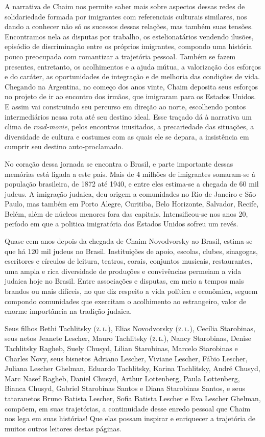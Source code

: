 A narrativa de Chaim nos permite saber mais sobre aspectos dessas redes
de solidariedade formada por imigrantes com referenciais culturais
similares, nos dando a conhecer não só os sucessos dessas relações, mas
também suas tensões. Encontramos nela as disputas por trabalho, os
estelionatários vendendo ilusões, episódio de discriminação entre os
próprios imigrantes, compondo uma história pouco preocupada com
romantizar a trajetória pessoal. Também se fazem presentes, entretanto,
os acolhimentos e a ajuda mútua, a valorização dos esforços e do
caráter, as oportunidades de integração e de melhoria das condições de
vida. Chegando na Argentina, no começo dos anos vinte, Chaim deposita
seus esforços no projeto de ir ao encontro dos irmãos, que imigraram
para os Estados Unidos. E assim vai construindo seu percurso em direção
ao norte, escolhendo pontos intermediários nessa rota até seu destino
ideal. Esse traçado dá à narrativa um clima de \textit{road-movie}, pelos
encontros inusitados, a precariedade das situações, a diversidade de
cultura e costumes com as quais ele se depara, a insistência em cumprir
seu destino auto-proclamado.

No coração dessa jornada se encontra o Brasil, e parte importante dessas
memórias está ligada a este país. Mais de 4 milhões de imigrantes
somaram-se à população brasileira, de 1872 até 1940, e entre eles
estima-se a chegada de 60 mil judeus. A imigração judaica, deu origem a
comunidades no Rio de Janeiro e São Paulo, mas também em Porto Alegre,
Curitiba, Belo Horizonte, Salvador, Recife, Belém, além de núcleos
menores fora das capitais. Intensificou-se nos anos 20, período em que a
politica imigratória dos Estados Unidos sofreu um revés.

Quase cem anos depois da chegada de Chaim Novodvorsky ao Brasil,
estima-se que há 120 mil judeus no Brasil. Instituições de apoio,
escolas, clubes, sinagogas, escritores e círculos de leitura, teatros,
corais, conjuntos musicais, restaurantes, uma ampla e rica diversidade
de produções e convivências permeiam a vida judaica hoje no Brasil.
Entre associações e disputas, em meio a tempos mais brandos ou mais
difíceis, no que diz respeito a vida política e econômica, seguem
compondo comunidades que exercitam o acolhimento ao estrangeiro, valor
de enorme importância na tradição judaica.

Seus filhos Bethi Tachlitsky (\textsc{z.\,l.}), Elias Novodvorsky (\textsc{z.\,l.}), Cecília
Starobinas, seus netos Jeanete Lescher, Mauro Tachlitsky (\textsc{z.\,l.}), Nancy
Starobinas, Denise Tachlitsky Ragheb, Suely Chusyd, Lilian Starobinas,
Marcelo Starobinas e Charles Novy, seus bisnetos Adriano Lescher,
Viviane Lescher, Fábio Lescher, Juliana Lescher Ghelman, Eduardo
Tachlitsky, Karina Tachlitsky, André Chusyd, Marc Nasef Ragheb, Daniel
Chusyd, Arthur Lottenberg, Paula Lottenberg, Bianca Chusyd, Gabriel
Starobinas Santos e Diana Starobinas Santos, e seus tataranetos Bruno
Batista Lescher, Sofia Batista Lescher e Eva Lescher Ghelman, compõem,
em suas trajetórias, a continuidade desse enredo pessoal que Chaim nos
lega em suas histórias! Que elas possam inspirar e enriquecer a
trajetória de muitos outros leitores destas páginas.